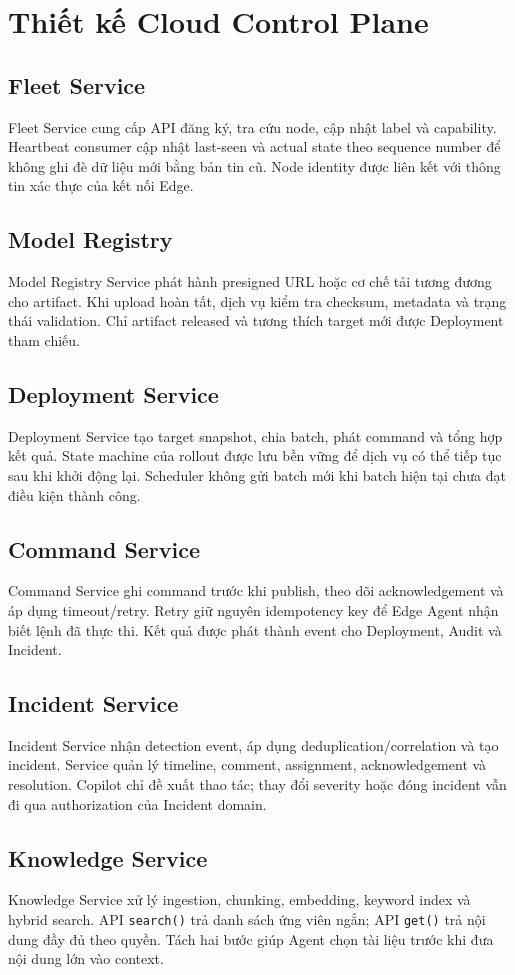 \section{Thiết kế Cloud Control Plane}

\subsection{Fleet Service}

Fleet Service cung cấp API đăng ký, tra cứu node, cập nhật label và capability.
Heartbeat consumer cập nhật last-seen và actual state theo sequence number để
không ghi đè dữ liệu mới bằng bản tin cũ. Node identity được liên kết với thông tin
xác thực của kết nối Edge.

\subsection{Model Registry}

Model Registry Service phát hành presigned URL hoặc cơ chế tải tương đương cho
artifact. Khi upload hoàn tất, dịch vụ kiểm tra checksum, metadata và trạng thái
validation. Chỉ artifact released và tương thích target mới được Deployment tham
chiếu.

\subsection{Deployment Service}

Deployment Service tạo target snapshot, chia batch, phát command và tổng hợp
kết quả. State machine của rollout được lưu bền vững để dịch vụ có thể tiếp tục
sau khi khởi động lại. Scheduler không gửi batch mới khi batch hiện tại chưa đạt
điều kiện thành công.

\subsection{Command Service}

Command Service ghi command trước khi publish, theo dõi acknowledgement và áp
dụng timeout/retry. Retry giữ nguyên idempotency key để Edge Agent nhận biết lệnh
đã thực thi. Kết quả được phát thành event cho Deployment, Audit và Incident.

\subsection{Incident Service}

Incident Service nhận detection event, áp dụng deduplication/correlation và tạo
incident. Service quản lý timeline, comment, assignment, acknowledgement và
resolution. Copilot chỉ đề xuất thao tác; thay đổi severity hoặc đóng incident vẫn
đi qua authorization của Incident domain.

\subsection{Knowledge Service}

Knowledge Service xử lý ingestion, chunking, embedding, keyword index và hybrid
search. API \texttt{search()} trả danh sách ứng viên ngắn; API \texttt{get()} trả
nội dung đầy đủ theo quyền. Tách hai bước giúp Agent chọn tài liệu trước khi đưa
nội dung lớn vào context.